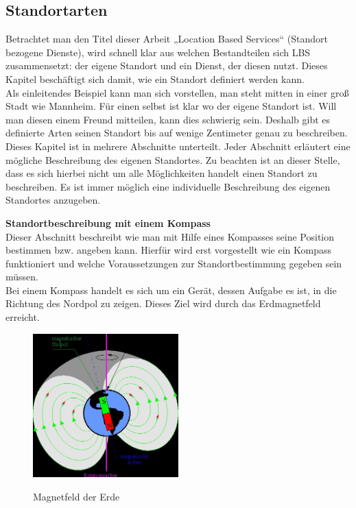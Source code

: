 \subsection{Standortarten}
Betrachtet man den Titel dieser Arbeit „Location Based Services“ (Standort bezogene Dienste), wird schnell klar aus welchen Bestandteilen sich LBS zusammensetzt: der eigene Standort und ein Dienst, der diesen nutzt. Dieses Kapitel beschäftigt sich damit, wie ein Standort definiert werden kann.
\\Als einleitendes Beispiel kann man sich vorstellen, man steht mitten in einer groß Stadt wie Mannheim. Für einen selbst ist klar wo der eigene Standort ist. Will man diesen einem Freund mitteilen, kann dies schwierig sein. Deshalb gibt es definierte Arten seinen Standort bis auf wenige Zentimeter genau zu beschreiben. Dieses Kapitel ist in mehrere Abschnitte unterteilt. Jeder Abschnitt erläutert eine mögliche Beschreibung des eigenen Standortes.
Zu beachten ist an dieser Stelle, dass es sich hierbei nicht um alle Möglichkeiten handelt einen Standort zu beschreiben. Es ist immer möglich eine individuelle Beschreibung des eigenen Standortes anzugeben. 

\textbf{Standortbeschreibung mit einem Kompass}
\\Dieser Abschnitt beschreibt wie man mit Hilfe eines Kompasses seine Position bestimmen bzw. angeben kann. Hierfür wird erst vorgestellt wie ein Kompass funktioniert und welche Voraussetzungen zur Standortbestimmung gegeben sein müssen.
\\Bei einem Kompass handelt es sich um ein Gerät, dessen Aufgabe es ist, in die Richtung des Nordpol zu zeigen. Dieses Ziel wird durch das Erdmagnetfeld erreicht.


\begin{figure}[ht]
  \centering
    \includegraphics[width=0.50\textwidth]{ref/images/magnetfeld.jpg}
   \caption{Magnetfeld der Erde}
  \label{fig:Magnetfeld}
  \cite{Magnetfeld}
\end{figure}



